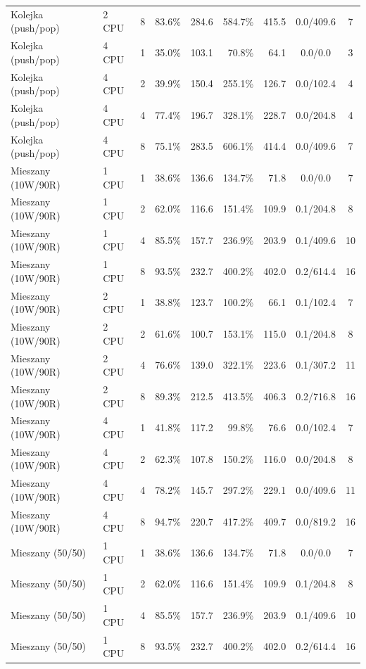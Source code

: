 \begin{table}[ht]
{\begin{tabular}{llcrrrrcc}
Kolejka (push/pop) & 2 CPU & 8 & 83.6\% & 284.6 & 584.7\% & 415.5 & 0.0/409.6 & 7 \\
Kolejka (push/pop) & 4 CPU & 1 & 35.0\% & 103.1 & 70.8\% & 64.1 & 0.0/0.0 & 3 \\
Kolejka (push/pop) & 4 CPU & 2 & 39.9\% & 150.4 & 255.1\% & 126.7 & 0.0/102.4 & 4 \\
Kolejka (push/pop) & 4 CPU & 4 & 77.4\% & 196.7 & 328.1\% & 228.7 & 0.0/204.8 & 4 \\
Kolejka (push/pop) & 4 CPU & 8 & 75.1\% & 283.5 & 606.1\% & 414.4 & 0.0/409.6 & 7 \\
Mieszany (10W/90R) & 1 CPU & 1 & 38.6\% & 136.6 & 134.7\% & 71.8 & 0.0/0.0 & 7 \\
Mieszany (10W/90R) & 1 CPU & 2 & 62.0\% & 116.6 & 151.4\% & 109.9 & 0.1/204.8 & 8 \\
Mieszany (10W/90R) & 1 CPU & 4 & 85.5\% & 157.7 & 236.9\% & 203.9 & 0.1/409.6 & 10 \\
Mieszany (10W/90R) & 1 CPU & 8 & 93.5\% & 232.7 & 400.2\% & 402.0 & 0.2/614.4 & 16 \\
Mieszany (10W/90R) & 2 CPU & 1 & 38.8\% & 123.7 & 100.2\% & 66.1 & 0.1/102.4 & 7 \\
Mieszany (10W/90R) & 2 CPU & 2 & 61.6\% & 100.7 & 153.1\% & 115.0 & 0.1/204.8 & 8 \\
Mieszany (10W/90R) & 2 CPU & 4 & 76.6\% & 139.0 & 322.1\% & 223.6 & 0.1/307.2 & 11 \\
Mieszany (10W/90R) & 2 CPU & 8 & 89.3\% & 212.5 & 413.5\% & 406.3 & 0.2/716.8 & 16 \\
Mieszany (10W/90R) & 4 CPU & 1 & 41.8\% & 117.2 & 99.8\% & 76.6 & 0.0/102.4 & 7 \\
Mieszany (10W/90R) & 4 CPU & 2 & 62.3\% & 107.8 & 150.2\% & 116.0 & 0.0/204.8 & 8 \\
Mieszany (10W/90R) & 4 CPU & 4 & 78.2\% & 145.7 & 297.2\% & 229.1 & 0.0/409.6 & 11 \\
Mieszany (10W/90R) & 4 CPU & 8 & 94.7\% & 220.7 & 417.2\% & 409.7 & 0.0/819.2 & 16 \\
Mieszany (50/50) & 1 CPU & 1 & 38.6\% & 136.6 & 134.7\% & 71.8 & 0.0/0.0 & 7 \\
Mieszany (50/50) & 1 CPU & 2 & 62.0\% & 116.6 & 151.4\% & 109.9 & 0.1/204.8 & 8 \\
Mieszany (50/50) & 1 CPU & 4 & 85.5\% & 157.7 & 236.9\% & 203.9 & 0.1/409.6 & 10 \\
Mieszany (50/50) & 1 CPU & 8 & 93.5\% & 232.7 & 400.2\% & 402.0 & 0.2/614.4 & 16 \\

\end{tabular}}
\end{table}
